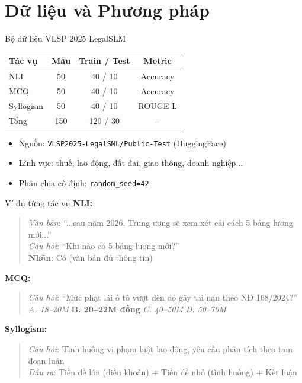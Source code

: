 \documentclass{beamer}
\begin{document}
\section{Dữ liệu và Phương pháp}

\begin{frame}{Bộ dữ liệu VLSP 2025 LegalSLM}
  \begin{table}
    \centering
    \begin{tabular}{lccc}
      \toprule
      \textbf{Tác vụ} & \textbf{Mẫu} & \textbf{Train / Test} & \textbf{Metric} \\
      \midrule
      NLI & 50 & 40 / 10 & Accuracy \\
      MCQ & 50 & 40 / 10 & Accuracy \\
      Syllogism & 50 & 40 / 10 & ROUGE-L \\
      \midrule
      Tổng & 150 & 120 / 30 & -- \\
      \bottomrule
    \end{tabular}
  \end{table}
  \vspace{0.3cm}
  \begin{itemize}
    \item Nguồn: \texttt{VLSP2025-LegalSML/Public-Test} (HuggingFace)
    \item Lĩnh vực: thuế, lao động, đất đai, giao thông, doanh nghiệp...
    \item Phân chia cố định: \texttt{random\_seed=42}
  \end{itemize}
\end{frame}

\begin{frame}{Ví dụ từng tác vụ}
  \textbf{NLI:}
  \begin{quote}
    \small \textit{Văn bản}: ``...sau năm 2026, Trung ương sẽ xem xét cải cách 5 bảng lương mới...''\\
    \textit{Câu hỏi}: ``Khi nào có 5 bảng lương mới?''\\
    \textbf{Nhãn}: Có (văn bản đủ thông tin)
  \end{quote}
  \textbf{MCQ:}
  \begin{quote}
    \small \textit{Câu hỏi}: ``Mức phạt lái ô tô vượt đèn đỏ gây tai nạn theo NĐ 168/2024?''\\
    \textit{A. 18--20M} \quad \textbf{B. 20--22M đồng} \quad \textit{C. 40--50M} \quad \textit{D. 50--70M}
  \end{quote}
  \textbf{Syllogism:}
  \begin{quote}
    \small \textit{Câu hỏi}: Tình huống vi phạm luật lao động, yêu cầu phân tích theo tam đoạn luận\\
    \textit{Đầu ra}: Tiền đề lớn (điều khoản) + Tiền đề nhỏ (tình huống) + Kết luận
  \end{quote}
\end{frame}
\end{document}
